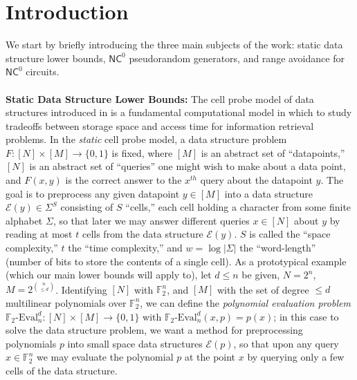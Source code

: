 \documentclass[11pt]{article}
\newcommand{\dash}{\text{-}}
\newcommand{\B}{\{0,1\}}
\newcommand{\N}{[N]}
\begin{document}
\section{Introduction}
We start by briefly introducing the three main subjects of the work: static data structure lower bounds, $\mathsf{NC}^0$ pseudorandom generators, and range avoidance for $\mathsf{NC}^0$ circuits. 
~\\~\\
{\bf \noindent Static Data Structure Lower Bounds:} 
The cell probe model of data structures introduced in \cite{eliasflower,yao} is a fundamental computational model in which to study tradeoffs between storage space and access time for information retrieval problems. In the \emph{static} cell probe model, a data structure problem $F: [N] \times [M] \to \B$ is fixed, where $[M]$ is an abstract set of ``datapoints,'' $[N]$ is an abstract set of ``queries'' one might wish to make about a data point, and $F(x,y)$ is the correct answer to the $x^{th}$ query about the datapoint $y$. The goal is to preprocess any given datapoint $y\in [M]$ into a data structure $\mathcal{E}(y) \in \Sigma^S$ consisting of $S$ ``cells,'' each cell holding a character from some finite alphabet $\Sigma$, so that later we may answer different queries $x \in \N$ about $y$ by reading at most $t$ cells from the data structure $\mathcal{E}(y)$. $S$ is called the ``space complexity,'' $t$ the ``time complexity,'' and $w=\log|\Sigma|$ the ``word-length'' (number of bits to store the contents of a single cell).
As a prototypical example (which our main lower bounds will apply to), let $d \leq n$ be given, $N=2^n$, $M = 2^{\binom{n}{\leq d}}$. Identifying $\N$ with $\mathbb{F}_2^n$, and $[M]$ with the set of degree $\leq d$ multilinear polynomials over $\mathbb{F}_2^n$, we can define the \emph{polynomial evaluation problem} $\mathbb{F}_2\dash\mathrm{Eval}_n^d:[N] \times [M] \to \B$ with $\mathbb{F}_2\dash\mathrm{Eval}_n^d(x,p)=p(x)$; in this case to solve the data structure problem, we want a method for preprocessing polynomials $p$ into small space data structures $\mathcal{E}(p)$, so that upon any query $x \in \mathbb{F}_2^n$ we may evaluate the polynomial $p$ at the point $x$ by querying only a few cells of the data structure.
\end{document}
